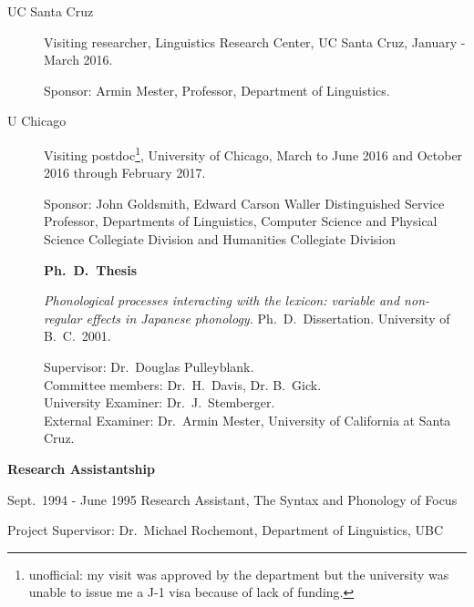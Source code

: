\documentclass[11pt]{article}
\newcommand{\ii}{\item}
\begin{document}
\begin{description}
\ii[UC Santa Cruz] Visiting researcher, Linguistics Research Center, UC Santa Cruz,
January - March 2016.

Sponsor: Armin Mester, Professor, Department of Linguistics.

\ii[U Chicago] Visiting postdoc\footnote{unofficial: my visit was approved by the department but the university was unable to issue me a J-1 visa because of lack of funding.},
University of Chicago, March to June 2016 and October 2016 through February 2017.

Sponsor: John Goldsmith, Edward Carson Waller Distinguished Service Professor, 
Departments of Linguistics, Computer Science and Physical Science Collegiate Division and Humanities Collegiate Division

\hspace{-1cm} \textbf{Ph.\ D.\ Thesis}

\medskip

\noindent\textit{Phonological processes interacting with the lexicon: variable and non-regular effects in
Japanese phonology.} Ph.\ D.\ Dissertation. University of B.\ C.\ 2001. 

\medskip

\noindent Supervisor: Dr.\ Douglas Pulleyblank. \\
Committee members: Dr.\ H.\ Davis, Dr. B.\ Gick. \\ 
University Examiner: Dr.\ J.\ Stemberger. \\
External Examiner: Dr.\ Armin Mester, University of California at Santa Cruz.

\end{description}

\noindent\textbf{Research Assistantship}

\medskip

Sept.\ 1994 - June 1995   Research Assistant, The Syntax and Phonology of Focus

Project Supervisor: Dr.\ Michael Rochemont, Department of Linguistics, UBC

\bigskip
\end{document}
